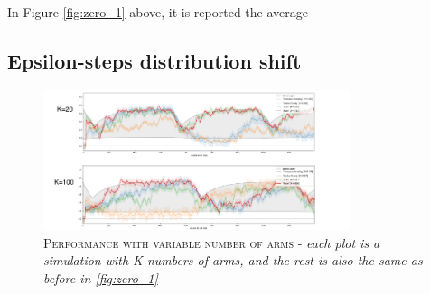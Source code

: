 \noindent In Figure \ref{fig:zero_1} above, it is reported the average


\newpage
\subsection{Epsilon-steps distribution shift}

\begin{figure}[h]
    \centering
    \includegraphics[width=0.8\textwidth]{figures/drawing2.png}
    \caption{\textsc{Performance with variable number of arms} - \textit{each plot is a simulation with K-numbers of arms, and the rest is also the same as before in \ref{fig:zero_1}}}
    \label{fig:eps_1}
\end{figure}

